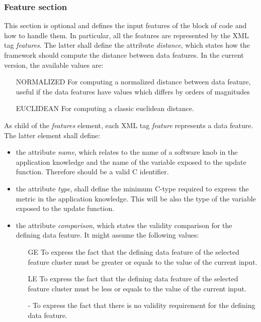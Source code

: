 \subsubsection*{Feature section}

This section is optional and defines the input features of the block of code and how to handle them.
In particular, all the features are represented by the XML tag \textit{features}.
The latter shall define the attribute \textit{distance}, which states how the framework should compute the distance between data features.
In the current version, the available values are:
\begin{itemize}
	\item[NORMALIZED] For computing a normalized distance between data feature, useful if the data features have values which differs by orders of magnitudes
	\item[EUCLIDEAN] For computing a classic euclidean distance. 
\end{itemize}

As child of the \textit{features} element, each XML tag \textit{feature} represents a data feature.
The latter element shall define:
\begin{itemize}
	\item the attribute \textit{name}, which relates to the name of a software knob in the application knowledge and the name of the variable exposed to the update function. Therefore should be a valid C identifier.
	\item the attribute \textit{type}, shall define the minimum C-type required to express the metric in the application knowledge. This will be also the type of the variable exposed to the update function.
	\item the attribute \textit{comparison}, which states the validity comparison for the defining data feature. It might assume the following values:
	\begin{itemize}
		\item[GE] To express the fact that the defining data feature of the selected feature cluster must be greater or equals to the value of the current input.
		\item[LE] To express the fact that the defining data feature of the selected feature cluster must be less or equals to the value of the current input.
		\item[-] To express the fact that there is no validity requirement for the defining data feature.
	\end{itemize}
\end{itemize}


